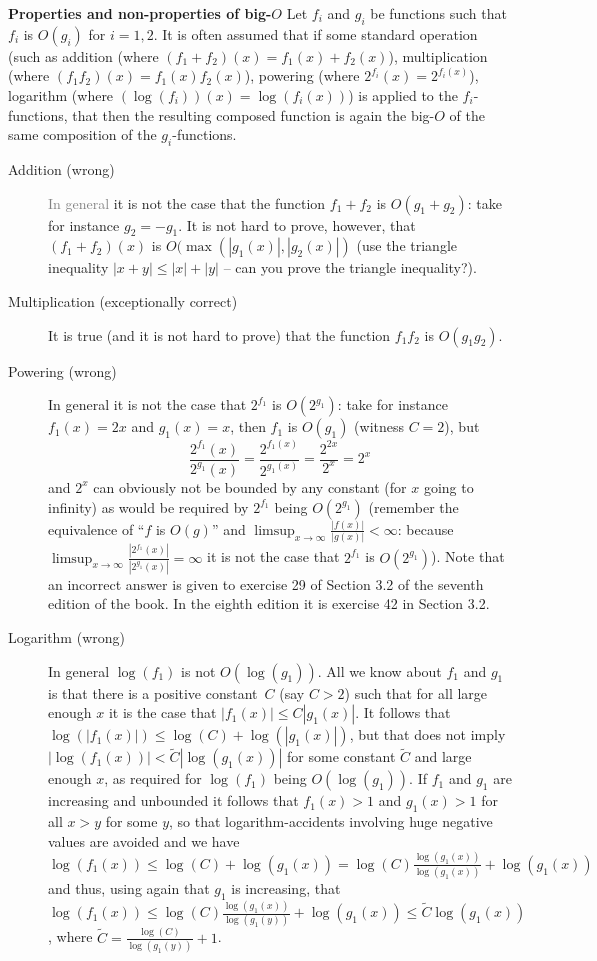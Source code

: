 \documentclass[titlepage]{article}
\theoremstyle{definition}
\numberwithin{equation}{subsection}
\numberwithin{remark}{subsection}
\begin{document}
\begin{tcolorbox}[drop shadow, title=(Properties and non-properties of big-O),lower separated=true]
{\bf{Properties and non-properties of big-$O$}} Let $f_i$ and $g_i$ be functions such that $f_i$ is $O(g_i)$ for $i=1,2$. It is often assumed that if some standard operation (such as addition (where $(f_1+f_2)(x)=f_1(x)+f_2(x)$), multiplication (where $(f_1f_2)(x)=f_1(x)f_2(x)$), powering (where $2^{f_i}(x)=2^{f_i(x)}$), logarithm (where $(\log(f_i))(x)=\log(f_i(x))$) is applied to the $f_i$-functions, that then the resulting composed function is again the big-$O$ of the same composition of the $g_i$-functions.
\begin{description}
\item[Addition (wrong)] \textcolor{gray}{In general} it is not the case that the function $f_1+f_2$ is $O(g_1+g_2)$: take for instance $g_2=-g_1$. It is not hard to prove, however, that $(f_1+f_2)(x)$ is $O(\max(|g_1(x)|,|g_2(x)|)$ (use the triangle inequality $|x+y|\le|x|+|y|$ -- can you prove the triangle inequality?).
\item[Multiplication (exceptionally correct)] It is true (and it is not hard to prove) that the function $f_1f_2$ is $O(g_1g_2)$.
\item[Powering (wrong)] In general it is not the case that $2^{f_1}$ is $O(2^{g_1})$: take for instance $f_1(x)=2x$ and $g_1(x)=x$, then $f_1$ is $O(g_1)$ (witness $C=2$), but $$\frac{2^{f_1}(x)}{2^{g_1}(x)}=\frac{2^{f_1(x)}}{2^{g_1(x)}}=\frac{2^{2x}}{2^x}=2^x$$
and $2^x$ can obviously not be bounded by any constant (for $x$ going to infinity) as would be required by $2^{f_1}$ being $O(2^{g_1})$ (remember the equivalence of ``$f$ is $O(g)$'' and $\limsup_{x\to\infty}\frac{|f(x)|}{|g(x)|}<\infty$:
because $\limsup_{x\to\infty}\frac{|2^{f_1}(x)|}{|2^{g_1}(x)|}=\infty$ it is not the case that $2^{f_1}$ is $O(2^{g_1})$).
Note that an incorrect answer is given to exercise 29 of Section 3.2 of the seventh edition of the book.
In the eighth edition it is exercise 42 in Section 3.2.
\item[Logarithm (wrong)] In general $\log(f_1)$ is not $O(\log(g_1))$. All we know about $f_1$ and $g_1$ is that there is a positive constant~$C$ (say $C>2$) such that for all large enough $x$ it is the case that $|f_1(x)|\le C|g_1(x)|$. It follows that $\log(|f_1(x)|)\le\log(C)+\log(|g_1(x)|)$, but that does not imply $|\log(f_1(x))|<\tilde C|\log(g_1(x))|$ for some constant $\tilde C$ and large enough $x$, as required for $\log(f_1)$ being $O(\log(g_1))$. If $f_1$ and $g_1$ are increasing and unbounded it follows that $f_1(x)>1$ and $g_1(x)>1$ for all $x>y$ for some $y$, so that logarithm-accidents involving huge negative values are avoided and we have $\log(f_1(x))\le\log(C)+\log(g_1(x))= \log(C)\frac{\log(g_1(x))}{\log(g_1(x))}+\log(g_1(x))$ and thus, using again that $g_1$ is  increasing, that $\log(f_1(x))\le\log(C)\frac{\log(g_1(x))}{\log(g_1(y))}+\log(g_1(x))\le\tilde C\log(g_1(x))$, where $\tilde C=\frac{\log(C)}{\log(g_1(y))}+1$. 

\end{description}
\end{tcolorbox}
\end{document}
